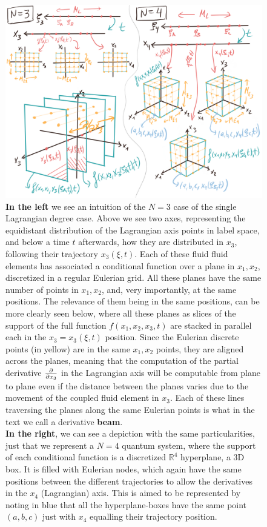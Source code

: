 \documentclass[11pt, a4paper]{article} %
\newcommand{\R}{\mathbb{R}} %
\begin{document}
\begin{figure}[p!]
  \centering
    \includegraphics[width=1\linewidth]{11one_Lagrangian.png}
  \caption{{\bf In the left} we see an intuition of the $N=3$ case of the single Lagrangian degree case. Above we see two axes, representing the equidistant distribution of the Lagrangian axis points in label space, and below a time $t$ afterwards, how they are distributed in $x_3$, following their trajectory $x_3(\xi,t)$. Each of these fluid fluid elements has associated a conditional function over a plane in $x_1,x_2$, discretized in a regular Eulerian grid. All these planes have the same number of points in $x_1,x_2$, and, very importantly, at the same positions. The relevance of them being in the same positions, can be more clearly seen below, where all these planes as slices of the support of the full function $f(x_1,x_2,x_3,t)$ are stacked in parallel each in the $x_3=x_3(\xi,t)$ position. Since the Eulerian discrete points (in yellow) are in the same $x_1,x_2$ points, they are aligned across the planes, meaning that the computation of the partial derivative $\pdv{}{x_3}$ in the Lagrangian axis will be computable from plane to plane even if the distance between the planes varies due to the movement of the coupled fluid element in $x_3$. Each of these lines traversing the planes along the same Eulerian points is what in the text we call a derivative {\bf beam}. \vspace{0.3cm}\\
{\bf In the right}, we can see a depiction with the same particularities, just that we represent a $N=4$ quantum system, where the support of each conditional function is a discretized $\R^4$ hyperplane, a 3D box. It is filled with Eulerian nodes, which again have the same positions between the different trajectories to allow the derivatives in the $x_4$ (Lagrangian) axis. This is aimed to be represented by noting in blue that all the hyperplane-boxes have the same point $(a,b,c)$ just with $x_4$ equalling their trajectory position. }
  \label{fig:hyperplane}
\end{figure}
\end{document}
